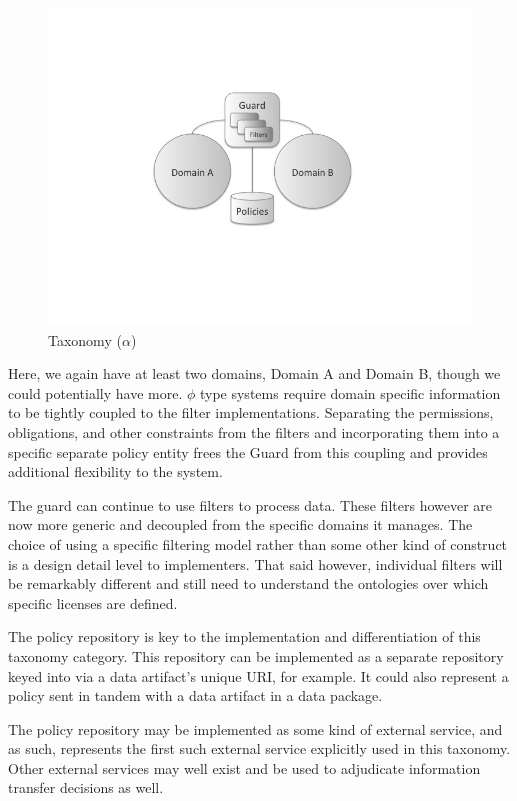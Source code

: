 \documentclass[12pt,letterpaper]{article}
\begin{document}
\begin{figure}[!t]
\centering
\includegraphics[width=5in]{model-alpha}
\caption{Taxonomy ($\alpha$)}
\label{fig:model:taxonomy-alpha}
\end{figure}

Here, we again have at least two domains, Domain A and Domain B, though we could potentially have more.  $\phi$ type systems require domain specific information to be tightly coupled to the filter implementations.  Separating the permissions, obligations, and other constraints from the filters and incorporating them into a specific separate policy entity frees the Guard from this coupling and provides additional flexibility to the system.

The guard can continue to use filters to process data.  These filters however are now more generic and decoupled from the specific domains it manages.  The choice of using a specific filtering model rather than some other kind of construct is a design detail level to implementers.  That said however, individual filters will be remarkably different and still need to understand the ontologies over which specific licenses are defined.

The policy repository is key to the implementation and differentiation of this taxonomy category.  This repository can be implemented as a separate repository keyed into via a data artifact's unique URI, for example.  It could also represent a policy sent in tandem with a data artifact in a data package.

The policy repository may be implemented as some kind of external service, and as such, represents the first such external service explicitly used in this taxonomy.  Other external services may well exist and be used to adjudicate information transfer decisions as well.
\end{document}
